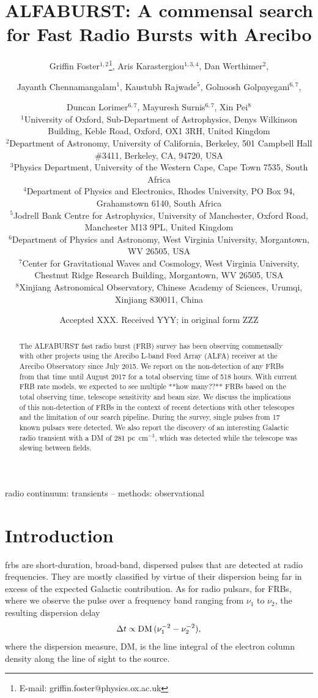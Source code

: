 \documentclass[a4paper,fleqn,usenatbib]{mnras}
\title[The ALFABURST Commensal FRB Survey]{ALFABURST: A commensal search for
Fast Radio Bursts with Arecibo}
\author[G. Foster et al.]{Griffin Foster$^{1,2}$\thanks{E-mail: griffin.foster@physics.ox.ac.uk},
Aris Karastergiou$^{1,3,4}$,
Dan Werthimer$^{2}$,
\and Jayanth Chennamangalam$^{1}$,
Kaustubh Rajwade$^{5}$,
Golnoosh Golpayegani$^{6,7}$,
\and Duncan Lorimer$^{6,7}$,
Mayuresh Surnis$^{6,7}$,
Xin Pei$^{8}$
\\
$^{1}$University of Oxford, Sub-Department of Astrophysics, Denys Wilkinson Building, Keble Road, Oxford, OX1 3RH, United Kingdom\\
$^{2}$Department of Astronomy, University of California, Berkeley, 501 Campbell Hall \#3411, Berkeley, CA, 94720, USA\\
$^{3}$Physics Department, University of the Western Cape, Cape Town 7535, South Africa\\
$^{4}$Department of Physics and Electronics, Rhodes University, PO Box 94, Grahamstown 6140, South Africa\\
$^{5}$Jodrell Bank Centre for Astrophysics, University of Manchester, Oxford Road, Manchester M13 9PL, United Kingdom\\ 
$^{6}$Department of Physics and Astronomy, West Virginia University, Morgantown, WV 26505, USA\\
$^{7}$Center for Gravitational Waves and Cosmology, West Virginia University, Chestnut Ridge Research Building, Morgantown, WV 26505, USA\\
$^{8}$Xinjiang Astronomical Observatory, Chinese Academy of Sciences, Urumqi, Xinjiang 830011, China\\
}
\date{Accepted XXX. Received YYY; in original form ZZZ}
\begin{document}
\label{firstpage}
\pagerange{\pageref{firstpage}--\pageref{lastpage}}
\maketitle

\begin{abstract}
The ALFABURST fast radio burst (FRB) survey has been observing commensally with
other projects using the Arecibo L-band Feed Array (ALFA) receiver at the
Arecibo Observatory since July 2015. We report on the non-detection of any FRBs
from that time until August 2017 for a total observing time of 518 hours.  With
current FRB rate models, we expected to see multiple **how many??** FRBs based
on the total observing time, telescope sensitivity and beam size. We discuss the
implications of this non-detection of FRBs in the context of recent detections
with other telescopes and the limitation of our search pipeline.  During the
survey, single pulses from 17 known pulsars were detected.  We also report the
discovery of an interesting Galactic radio transient with a DM of 281
pc~cm$^{-3}$, which was detected while the telescope was slewing between fields.
\end{abstract}

\begin{keywords}
radio continuum: transients -- methods: observational
\end{keywords}


\section{Introduction}
\label{sec:intro}

\glspl{frb} are short-duration, broad-band, dispersed pulses that are detected
at radio frequencies. They are mostly classified by virtue of their dispersion
being far in excess of the expected Galactic contribution. As for radio pulsars,
for FRBs, where we observe the pulse over a frequency band ranging from $\nu_1$
to $\nu_2$, the resulting dispersion delay 
%
\begin{equation}
\Delta t \propto {\rm DM} \, (\nu_1^{-2} - \nu_2^{-2}),
\end{equation}
%
where the dispersion measure, DM, is the line integral of the electron column
density along the line of sight to the source.
\end{document}
